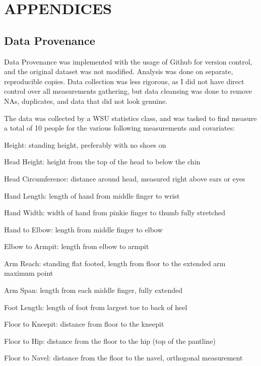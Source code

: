 \documentclass[]{article}
\begin{document}
\newpage



\newpage

\section{APPENDICES}
\label{sec:appendix}

\subsection{Data Provenance}
\label{sec:appendix-data-provenance}

Data Provenance was implemented with the usage of Github for version
control, and the original dataset was not modified. Analysis was done on
separate, reproducible copies. Data collection was less rigorous, as I
did not have direct control over all measurements gathering, but data
cleansing was done to remove NAs, duplicates, and data that did not look
genuine.

The data was collected by a WSU statistics class, and was tasked to find
measure a total of 10 people for the various following measurements and
covariates:\vspace{5mm}

Height: standing height, preferably with no shoes on

Head Height: height from the top of the head to below the chin

Head Circumference: distance around head, measured right above ears or
eyes

Hand Length: length of hand from middle finger to wrist

Hand Width: width of hand from pinkie finger to thumb fully stretched

Hand to Elbow: length from middle finger to elbow

Elbow to Armpit: length from elbow to armpit

Arm Reach: standing flat footed, length from floor to the extended arm
maximum point

Arm Span: length from each middle finger, fully extended

Foot Length: length of foot from largest toe to back of heel

Floor to Kneepit: distance from floor to the kneepit

Floor to Hip: distance from the floor to the hip (top of the pantline)

Floor to Navel: distance from the floor to the navel, orthogonal
measurement
\end{document}
